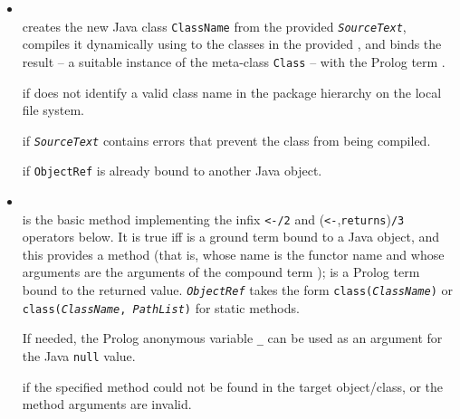 \begin{itemize}

\item {}\\
    \noindent{}
    creates the new Java class \texttt{ClassName} from the provided \texttt{\textit{SourceText}}, compiles it dynamically using to the classes in the provided , and binds the result -- a suitable instance of the meta-class \texttt{Class} -- with the Prolog term .


     if  does not identify a valid class name in the package hierarchy on the local file system.

     if \texttt{\textit{SourceText}} contains errors that prevent the class from being compiled.

     if \texttt{ObjectRef} is already bound to another Java object.


\item {}\\
    \noindent{} is the basic method implementing the infix \verb|<-/2| and (\verb|<-|,\texttt{returns})\texttt{/3} operators below. It is true iff  is a ground term bound to a Java object, and this provides a method  (that is, whose name is the functor name and whose arguments are the arguments of the compound term );  is a Prolog term bound to the returned value.
    \texttt{\textit{ObjectRef}} takes the form \texttt{class(\textit{ClassName})} or \texttt{class(\textit{ClassName}, \textit{PathList})} for static methods.

    If needed, the Prolog anonymous variable \texttt{\_} can be used as an argument for the Java \texttt{null} value.


     if the specified method could not be found in the target object/class, or the method arguments are invalid.


\end{itemize}

